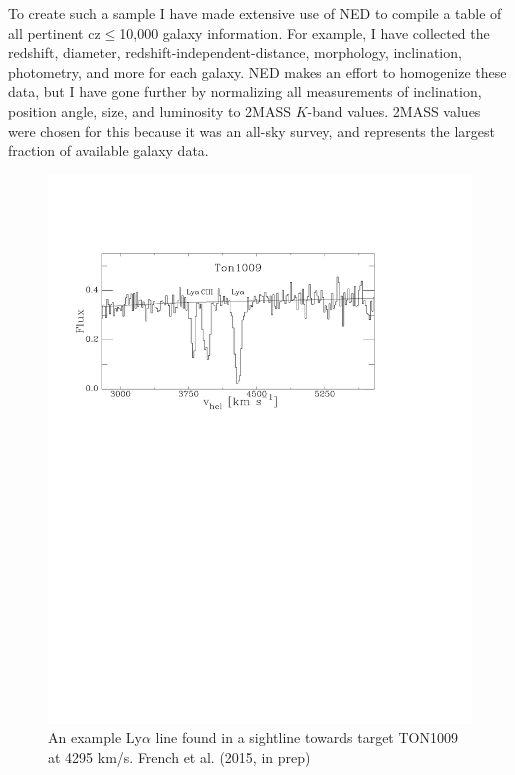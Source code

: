 \documentclass[iop]{emulateapj-rtx4}
\begin{document}
To create such a sample I have made extensive use of NED to compile a table of all pertinent cz$\leq$10,000 galaxy information. For example, I have collected the redshift, diameter, redshift-independent-distance, morphology, inclination, photometry, and more for each galaxy. NED makes an effort to homogenize these data, but I have gone further by normalizing all measurements of inclination, position angle, size, and luminosity to 2MASS $K$-band values. 2MASS values were chosen for this because it was an all-sky survey, and represents the largest fraction of available galaxy data.
\begin{figure}[h!]
\centering
  \includegraphics[width=1.\linewidth]{figTON1009_crop.pdf}
  \caption{An example Ly$\alpha$ line found in a sightline towards target TON1009 at 4295 km/s. French et al. (2015, in prep)}
  \label{line}
\end{figure}
\end{document}
